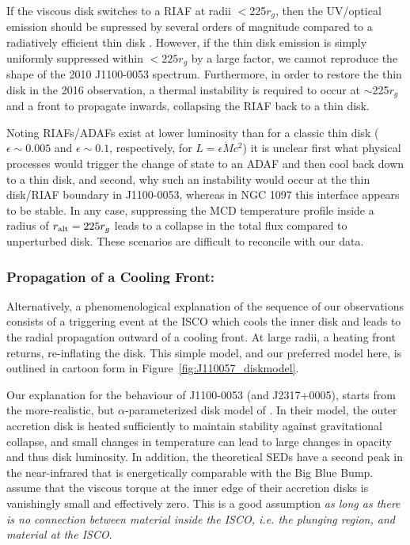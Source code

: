 \documentclass[a4paper,fleqn,usenatbib]{mnras}
\begin{document}
{If the viscous disk switches to a RIAF at radii $<$225$r_{g}$, then
the UV/optical emission should be supressed by several orders of
magnitude compared to a radiatively efficient thin disk
\citep{Narayan1998, Abramowicz2002, Abramowicz2013}. However, if the
thin disk emission is simply uniformly suppressed within $<225r_{g}$
by a large factor, we cannot reproduce the shape of the 2010
J1100-0053 spectrum. Furthermore, in order to restore the thin disk in
the 2016 observation, a thermal instability is required to occur at
$\sim$225$r_{g}$ and a front to propagate inwards, collapsing the RIAF
back to a thin disk.

Noting RIAFs/ADAFs exist at lower luminosity than for a classic thin
disk ($\epsilon \sim 0.005$ and $\epsilon \sim 0.1$, respectively, for
$L=\epsilon \dot{M} c^{2}$) it is unclear first what physical
processes would trigger the change of state to an ADAF and then cool
back down to a thin disk, and second, why such an instability would
occur at the thin disk/RIAF boundary in J1100-0053, whereas in NGC
1097 this interface appears to be stable. In any case, suppressing the
MCD temperature profile inside a radius of $r_{{\rm alt}} = 225 r_{g}$
leads to a collapse in the total flux compared to unperturbed disk. 
These scenarios are difficult to reconcile with our data.


\subsubsection{Propagation of a Cooling Front:}
Alternatively, a phenomenological explanation of the sequence of our
observations consists of a triggering event at the ISCO which cools
the inner disk and leads to the radial propagation outward of a
cooling front. At large radii, a heating front returns, re-inflating
the disk. This simple model, and our preferred model here, is outlined
in cartoon form in Figure~\ref{fig:J110057_diskmodel}.

Our explanation for the behaviour of J1100-0053 (and J2317+0005),
starts from the more-realistic, but $\alpha$-parameterized disk model
of \citet{Sirko_Goodman2003}. In their model, the outer accretion disk
is heated sufficiently to maintain stability against gravitational
collapse, and small changes in temperature can lead to large changes
in opacity and thus disk luminosity. In addition, the theoretical SEDs
have a second peak in the near-infrared that is energetically
comparable with the Big Blue Bump. \citet{Sirko_Goodman2003} assume
that the viscous torque at the inner edge of their accretion disks is
vanishingly small and effectively zero. This is a good assumption 
\emph{as long as there is no connection between
material inside the ISCO, i.e. the plunging region, and material at
the ISCO}.

}
\end{document}

